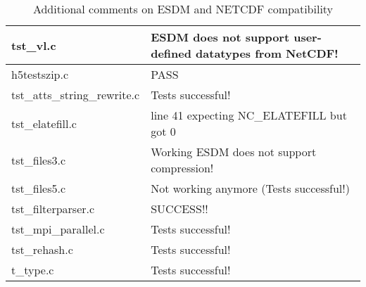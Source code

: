 \begin{table}[H]
\begin{tabular}{|l|l|}
tst\_vl.c   &   ESDM does not support user-defined datatypes from NetCDF!    \\ \hline
h5testszip.c   & PASS   \\ \hline
tst\_atts\_string\_rewrite.c   & Tests successful!  \\ \hline
tst\_elatefill.c   & line 41 expecting NC\_ELATEFILL but got 0   \\ \hline
tst\_files3.c   & Working ESDM does not support compression!   \\ \hline
tst\_files5.c   & Not working anymore (Tests successful!)  \\ \hline
tst\_filterparser.c   & SUCCESS!!   \\ \hline
tst\_mpi\_parallel.c   & Tests successful!   \\ \hline
tst\_rehash.c   & Tests successful!  \\ \hline
t\_type.c   & Tests successful!   \\ \hline
\hline
\end{tabular}
\caption{Additional comments on ESDM and NETCDF compatibility}
\end{table}

